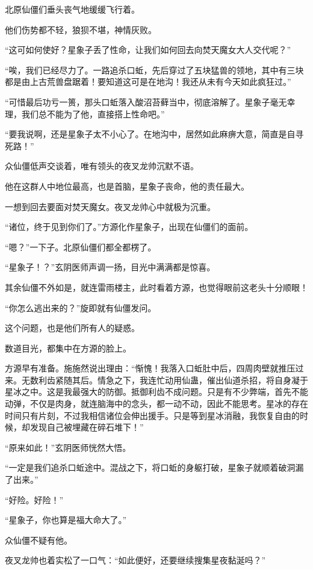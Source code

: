 \begin{this_body}
北原仙僵们垂头丧气地缓缓飞行着。

他们伤势都不轻，狼狈不堪，神情灰败。

“这可如何使好？星象子丢了性命，让我们如何回去向焚天魔女大人交代呢？”

“唉，我们已经尽力了。一路追杀口蚯，先后穿过了五块猛兽的领地，其中有三块都是由上古荒兽盘踞着！要知道这可是在地沟！我还从未有今天如此疯狂过。”

“可惜最后功亏一篑，那头口蚯落入酸沼苔藓当中，彻底溶解了。星象子毫无幸理，我们总不能为了他，直接搭上性命吧。”

“要我说啊，还是星象子太不小心了。在地沟中，居然如此麻痹大意，简直是自寻死路！”

众仙僵低声交谈着，唯有领头的夜叉龙帅沉默不语。

他在这群人中地位最高，也是首脑，星象子丧命，他的责任最大。

一想到回去要面对焚天魔女。夜叉龙帅心中就极为沉重。

“诸位，终于见到你们了。”方源化作星象子，出现在仙僵们的面前。

“嗯？”一下子。北原仙僵们都全都楞了。

“星象子！？”玄阴医师声调一扬，目光中满满都是惊喜。

其余仙僵不外如是，就连雷雨楼主，此时看着方源，也觉得眼前这老头十分顺眼！

“你怎么逃出来的？”旋即就有仙僵发问。

这个问题，也是他们所有人的疑惑。

数道目光，都集中在方源的脸上。

方源早有准备。施施然说出理由：“惭愧！我落入口蚯肚中后，四周肉壁就推压过来。无数利齿紧随其后。情急之下，我连忙动用仙蛊，催出仙道杀招，将自身凝于星冰之中。这是我最强大的防御。抵御利齿不成问题。只是有不少弊端，首先不能动弹，不仅是肉身，就连脑海中的念头，都一动不动，因此不能思考。星冰的存在时间只有片刻，不过我相信诸位会伸出援手。只是等到星冰消融，我恢复自由的时候，却发现自己被埋藏在碎石堆下！”

“原来如此！”玄阴医师恍然大悟。

“一定是我们追杀口蚯途中。混战之下，将口蚯的身躯打破，星象子就顺着破洞漏了出来。”

“好险。好险！”

“星象子，你也算是福大命大了。”

众仙僵不疑有他。

夜叉龙帅也着实松了一口气：“如此便好，还要继续搜集星夜黏涎吗？”


\end{this_body}
